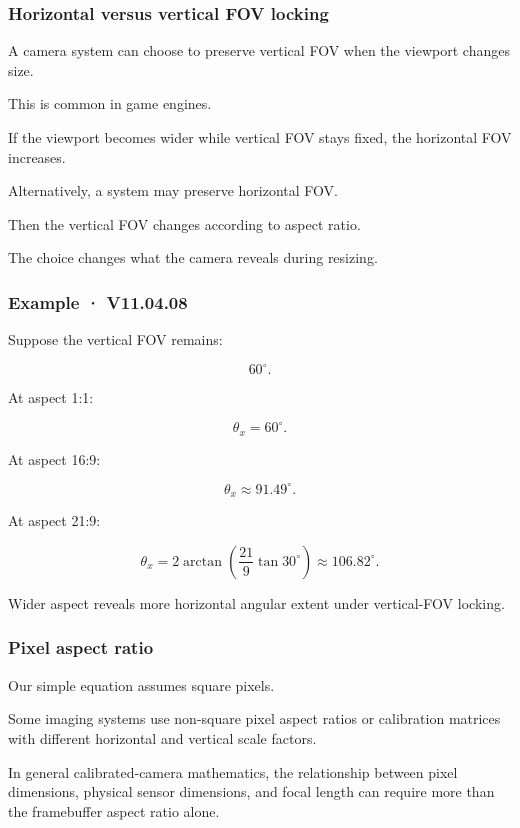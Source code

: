 \subsubsection{Horizontal versus vertical FOV locking}\label{horizontal-versus-vertical-fov-locking}

A camera system can choose to preserve vertical FOV when the viewport changes size.

This is common in game engines.

If the viewport becomes wider while vertical FOV stays fixed, the horizontal FOV increases.

Alternatively, a system may preserve horizontal FOV.

Then the vertical FOV changes according to aspect ratio.

The choice changes what the camera reveals during resizing.

\subsubsection{Example · V11.04.08}\label{example-v11.04.08}

Suppose the vertical FOV remains:

\[
 60^\circ.
\]

At aspect 1:1:

\[
 \theta_x=60^\circ.
\]

At aspect 16:9:

\[
 \theta_x\approx91.49^\circ.
\]

At aspect 21:9:

\[
 \theta_x= 2\arctan\left(\frac{21}{9}\tan30^\circ\right) \approx106.82^\circ.
\]

Wider aspect reveals more horizontal angular extent under vertical-FOV locking.

\subsubsection{Pixel aspect ratio}\label{pixel-aspect-ratio}

Our simple equation assumes square pixels.

Some imaging systems use non-square pixel aspect ratios or calibration matrices with different horizontal and vertical scale factors.

In general calibrated-camera mathematics, the relationship between pixel dimensions, physical sensor dimensions, and focal length can require more than the framebuffer aspect ratio alone.

